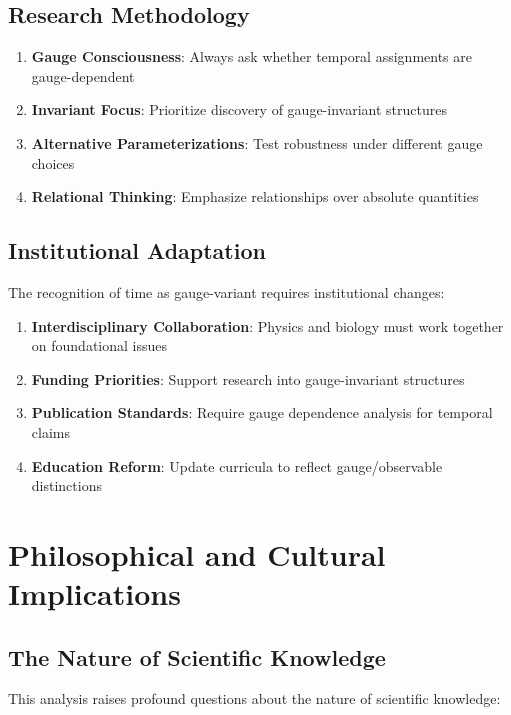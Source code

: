 \documentclass[11pt]{article}
\theoremstyle{definition}
\theoremstyle{plain}
\theoremstyle{remark}
\begin{document}
\subsection{Research Methodology}

\begin{enumerate}
\item \textbf{Gauge Consciousness}: Always ask whether temporal assignments are gauge-dependent
\item \textbf{Invariant Focus}: Prioritize discovery of gauge-invariant structures
\item \textbf{Alternative Parameterizations}: Test robustness under different gauge choices
\item \textbf{Relational Thinking}: Emphasize relationships over absolute quantities
\end{enumerate}

\subsection{Institutional Adaptation}

The recognition of time as gauge-variant requires institutional changes:

\begin{enumerate}
\item \textbf{Interdisciplinary Collaboration}: Physics and biology must work together on foundational issues
\item \textbf{Funding Priorities}: Support research into gauge-invariant structures
\item \textbf{Publication Standards}: Require gauge dependence analysis for temporal claims
\item \textbf{Education Reform}: Update curricula to reflect gauge/observable distinctions
\end{enumerate}

\section{Philosophical and Cultural Implications}

\subsection{The Nature of Scientific Knowledge}

This analysis raises profound questions about the nature of scientific knowledge:
\end{document}
